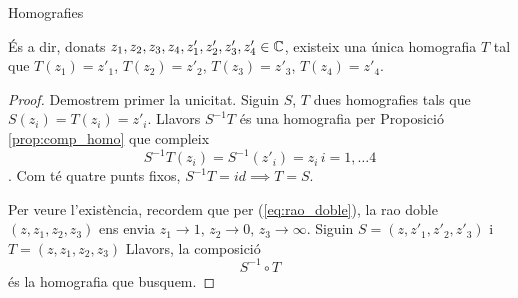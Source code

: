 \documentclass[dvipsnames, svgnames, leqno, a4paper, 12pt]{report}
\begin{document}
\begin{chapter}{Homografies}
\begin{theorem}
        És a dir, donats $z_1,z_2,z_3,z_4,z'_1,z'_2,z'_3,z'_4\in\mathbb{C}$, existeix una única homografia $T$ tal que $T(z_1)=z'_1$, $T(z_2)=z'_2$, $T(z_3)=z'_3$, $T(z_4)=z'_4$.
    \end{theorem}
    \begin{proof}
        Demostrem primer la unicitat. Siguin $S$, $T$ dues homografies tals que $S(z_i)=T(z_i)=z'_i$. Llavors $S^{-1}T$ és una homografia per Proposició \ref{prop:comp_homo} que compleix \[S^{-1}T(z_i)=S^{-1}(z'_i)=z_i\, i=1,\dots4\]. Com té quatre punts fixos, $S^{-1}T=id\implies T=S$.

        Per veure l'existència, recordem que per (\ref{eq:rao_doble}), la rao doble $(z,z_1,z_2,z_3)$ ens envia $z_1\to1,\, z_2\to0,\, z_3\to\infty$. 
        Siguin $S=(z,z'_1,z'_2,z'_3)$ i $T=(z,z_1,z_2,z_3)$
        Llavors, la composició \begin{displaymath}
            S^{-1}\circ T
        \end{displaymath}
        és la homografia que busquem.
    \end{proof}
\end{chapter}
\end{document}
